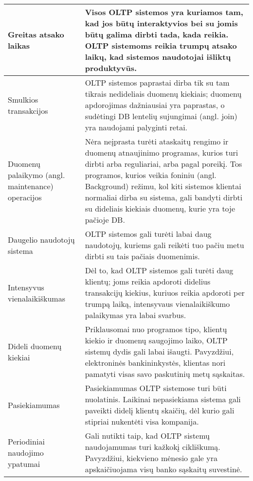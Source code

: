 \documentclass[12pt,a4paper,titlepage]{article}
\begin{document}
\begin{longtable}{|p{3cm}|p{9.8cm}|}
\hline \hline
\endlastfoot
\hline 
Greitas atsako laikas 
&
Visos OLTP sistemos yra kuriamos tam, kad jos būtų interaktyvios bei su jomis būtų galima dirbti tada, kada reikia. OLTP sistemoms reikia trumpų atsako laikų, kad sistemos naudotojai išliktų produktyvūs. \\ 
\hline
Smulkios transakcijos 
&
OLTP sistemos paprastai dirba tik su tam tikrais nedideliais duomenų kiekiais; duomenų apdorojimas dažniausiai yra paprastas, o sudėtingi DB lentelių sujungimai (angl. join) yra naudojami palyginti retai. 
\\ 
\hline
Duomenų palaikymo (angl. maintenance) operacijos 
&
Nėra neįprasta turėti ataskaitų rengimo ir duomenų atnaujinimo programas, kurios turi dirbti arba reguliariai, arba pagal poreikį. Tos programos, kurios veikia foniniu (angl. Background) režimu, kol kiti sistemos klientai normaliai dirba su sistema, gali bandyti dirbti su dideliais kiekiais duomenų, kurie yra toje pačioje DB.
\\
\hline
Daugelio naudotojų sistema
&
OLTP sistemos gali turėti labai daug naudotojų, kuriems gali reikėti tuo pačiu metu dirbti su tais pačiais duomenimis.
\\
\hline
Intensyvus vienalaikiškumas
&
Dėl to, kad OLTP sistemos gali turėti daug klientų; joms reikia apdoroti didelius transakcijų kiekius, kuriuos reikia apdoroti per trumpą laiką, intensyvaus vienalaikiškumo palaikymas yra labai svarbus.
\\
\hline
Dideli duomenų kiekiai
&
Priklausomai nuo programos tipo, klientų kiekio ir duomenų saugojimo laiko, OLTP sistemų dydis gali labai išaugti. Pavyzdžiui, elektroninės bankininkystės, klientas nori pamatyti visas savo paskutinių metų sąskaitas.
\\
\hline
Pasiekiamumas
&
Pasiekiamumas OLTP sistemose turi būti nuolatinis. Laikinai nepasiekiama sistema gali paveikti didelį klientų skaičių, dėl kurio gali stipriai nukentėti visa kompanija.
\\
\hline
Periodiniai naudojimo ypatumai
&
Gali nutikti taip, kad OLTP sistemų naudojamumas turi kažkokį cikliškumą. Pavyzdžiui, kiekvieno mėnesio gale yra apskaičiuojama visų banko sąskaitų suvestinė.
\\
\hline
\end{longtable}
\end{document}
